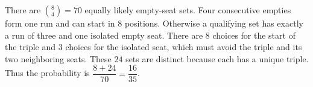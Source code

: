 There are $\binom84=70$ equally likely empty-seat sets. Four consecutive empties form one run and can start in $8$ positions. Otherwise a qualifying set has exactly a run of three and one isolated empty seat. There are $8$ choices for the start of the triple and $3$ choices for the isolated seat, which must avoid the triple and its two neighboring seats. These $24$ sets are distinct because each has a unique triple. Thus the probability is $\dfrac{8+24}{70}=\boxed{\dfrac{16}{35}}$.
